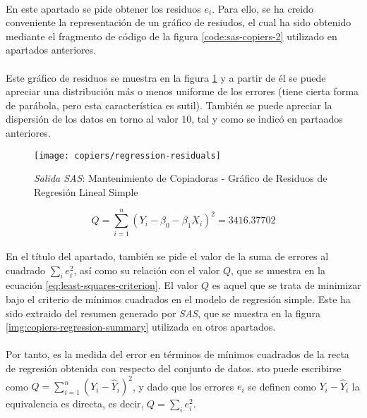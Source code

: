 \documentclass{article}
\begin{document}
        \paragraph{}
        En este apartado se pide obtener los residuos $e_i$. Para ello, se ha creido conveniente la representación de un gráfico de resiudos, el cual ha sido obtenido mediante el fragmento de código de la figura \ref{code:sas-copiers-2} utilizado en apartados anteriores.

        \paragraph{}
        Este gráfico de residuos se muestra en la figura \ref{img:copiers-regression-residuals} y a partir de él se puede apreciar una distribución más o menos uniforme de los errores (tiene cierta forma de parábola, pero esta característica es sutil). También se puede apreciar la dispersión de los datos en torno al valor $10$, tal y como se indicó en partaados anteriores.

        \begin{figure}[!h]
          \centering
          \texttt{[image: copiers/regression-residuals]}
          \caption{\emph{Salida SAS}: Mantenimiento de Copiadoras - Gráfico de Residuos de Regresión Lineal Simple}
          \label{img:copiers-regression-residuals}
        \end{figure}

        \begin{equation}
        \label{eq:least-squares-criterion}
          Q = \sum\limits_{i=1}^n(Y_i - \beta_0 - \beta_1X_i)^2 = 3416.37702
        \end{equation}

        \paragraph{}
        En el título del apartado, también se pide el valor de la suma de errores al cuadrado $\sum_i e_i^2$, así como su relación con el valor $Q$, que se muestra en la ecuación \eqref{eq:least-squares-criterion}. El valor $Q$ es aquel que se trata de minimizar bajo el criterio de mínimos cuadrados en el modelo de regresión simple. Este ha sido extraido del resumen generado por \emph{SAS}, que se muestra en la figura \ref{img:copiers-regression-summary} utilizada en otros apartados.

        \paragraph{}
        Por tanto, es la medida del error en términos de mínimos cuadrados de la recta de regresión obtenida con respecto del conjunto de datos. sto puede escribirse como $Q = \sum_{i=1}^n(Y_i - \widehat{Y}_i)^2$, y dado que los errores $e_i$ se definen como $Y_i - \widehat{Y}_i$ la equivalencia es directa, es decir, $Q = \sum_i e_i^2$.
\end{document}

